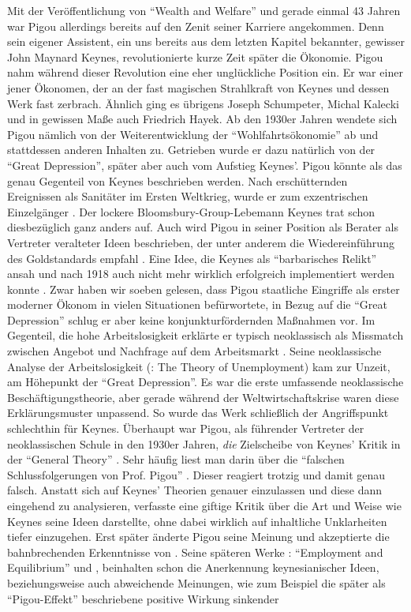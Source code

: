 Mit der Veröffentlichung von "`Wealth and Welfare"' und gerade einmal 43 Jahren war Pigou allerdings bereits auf den Zenit seiner Karriere angekommen. Denn sein eigener Assistent, ein uns bereits aus dem letzten Kapitel bekannter, gewisser John Maynard Keynes, revolutionierte kurze Zeit später die Ökonomie. Pigou nahm während dieser Revolution eine eher unglückliche Position ein. Er war einer jener Ökonomen, der an der fast magischen Strahlkraft von Keynes und dessen Werk fast zerbrach. Ähnlich ging es übrigens Joseph Schumpeter, Michal Kalecki und in gewissen Maße auch Friedrich Hayek. Ab den 1930er Jahren wendete sich Pigou nämlich von der Weiterentwicklung der "`Wohlfahrtsökonomie"' ab und stattdessen anderen Inhalten zu. Getrieben wurde er dazu natürlich von der "`Great Depression"', später aber auch vom Aufstieg Keynes'.  
Pigou könnte als das genau Gegenteil von Keynes beschrieben werden. Nach erschütternden Ereignissen als Sanitäter im Ersten Weltkrieg, wurde er zum exzentrischen Einzelgänger \parencite[S. 153]{Johnson1960}. Der lockere Bloomsbury-Group-Lebemann Keynes trat schon diesbezüglich ganz anders auf. Auch wird Pigou in seiner Position als Berater als Vertreter veralteter Ideen beschrieben, der unter anderem die Wiedereinführung des Goldstandards empfahl \parencite[S. 232]{Cansier1989}. Eine Idee, die Keynes als "`barbarisches Relikt"' ansah und nach 1918 auch nicht mehr wirklich erfolgreich implementiert werden konnte \parencite[S. 232]{Cansier1989}. Zwar haben wir soeben gelesen, dass Pigou staatliche Eingriffe als erster moderner Ökonom in vielen Situationen befürwortete, in Bezug auf die "`Great Depression"' schlug er aber keine konjunkturfördernden Maßnahmen vor. Im Gegenteil, die hohe Arbeitslosigkeit erklärte er typisch neoklassisch als Missmatch zwischen Angebot und Nachfrage auf dem Arbeitsmarkt \parencite[S. 232]{Cansier1989}. Seine neoklassische Analyse der Arbeitslosigkeit (\textcite{Pigou1933}: The Theory of Unemployment) kam zur Unzeit, am Höhepunkt der "`Great Depression"'. Es war die erste umfassende neoklassische Beschäftigungstheorie, aber gerade während der Weltwirtschaftskrise waren diese Erklärungsmuster unpassend. So wurde das Werk schließlich der Angriffspunkt schlechthin für Keynes. Überhaupt war Pigou, als führender Vertreter der neoklassischen Schule in den 1930er Jahren, \textit{die} Zielscheibe von Keynes' Kritik in der "`General Theory"' \parencite[S. 154]{Johnson1960}. Sehr häufig liest man darin über die "`falschen Schlussfolgerungen von Prof. Pigou"' \parencite[S. 73]{Keynes1936}. Dieser reagiert trotzig und damit genau falsch. Anstatt sich auf Keynes' Theorien genauer einzulassen und diese dann eingehend zu analysieren, verfasste \textcite{Pigou1936} eine giftige Kritik über die Art und Weise wie Keynes seine Ideen darstellte, ohne dabei wirklich auf inhaltliche Unklarheiten tiefer einzugehen. Erst später änderte Pigou seine Meinung und akzeptierte die bahnbrechenden Erkenntnisse von \textcite{Keynes1936} \parencite[S. 154]{Johnson1960}. Seine späteren Werke \textcite{Pigou1941}: "`Employment and Equilibrium"' und \textcite{Pigou1943}, beinhalten schon die Anerkennung keynesianischer Ideen, beziehungsweise auch abweichende Meinungen, wie zum Beispiel die später als "`Pigou-Effekt"' beschriebene positive Wirkung sinkender 